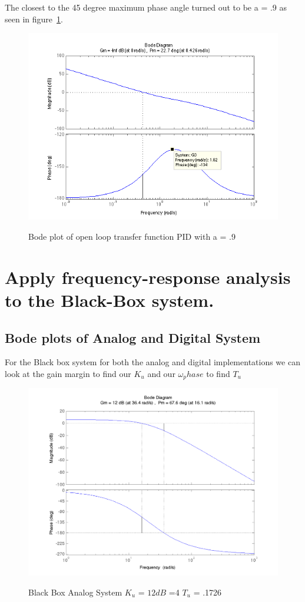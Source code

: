 \documentclass[english]{article}
\begin{document}
\FloatBarrier
The closest to the 45 degree maximum phase angle turned out to be a = .9 
as seen in figure~\ref{fig:3_e3}. 
\begin{figure}[h!]
\caption{Bode plot of open loop transfer function PID with a = .9} 
\includegraphics[width = \linewidth]{3e_apoint9.png}
\label{fig:3_e3}
\end{figure}
\FloatBarrier

\section*{Apply frequency-response analysis to the Black-Box system.}
\subsection{Bode plots of Analog and Digital System}
For the Black box system for both the analog and digital implementations we can look at the gain margin to find our $K_u$ and our $\omega_phase$ to find $T_u$ 
\begin{figure}[h!]
\caption{Black Box Analog System $K_u$ = $12dB$ =4  $T_u$ = .1726} 
\includegraphics[width = \linewidth]{part4_analog.png}
\label{fig:4_a1}
\end{figure}
\end{document}
